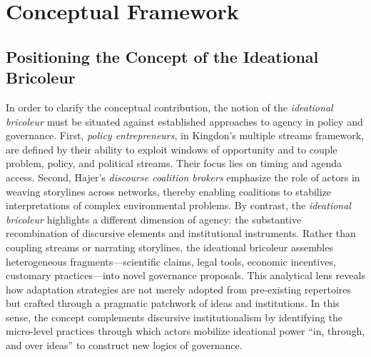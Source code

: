 \section*{Conceptual Framework}
\subsection*{Positioning the Concept of the Ideational Bricoleur}

In order to clarify the conceptual contribution, the notion of the 
\textit{ideational bricoleur} must be situated against established approaches to 
agency in policy and governance. First, \textit{policy entrepreneurs}, in 
Kingdon’s multiple streams framework, are defined by their ability to exploit 
windows of opportunity and to couple problem, policy, and political streams. 
Their focus lies on timing and agenda access. Second, Hajer’s 
\textit{discourse coalition brokers} emphasize the role of actors in weaving 
storylines across networks, thereby enabling coalitions to stabilize 
interpretations of complex environmental problems. By contrast, the 
\textit{ideational bricoleur} highlights a different dimension of agency: the 
substantive recombination of discursive elements and institutional instruments. 
Rather than coupling streams or narrating storylines, the ideational bricoleur 
assembles heterogeneous fragments---scientific claims, legal tools, economic 
incentives, customary practices---into novel governance proposals. This 
analytical lens reveals how adaptation strategies are not merely adopted from 
pre-existing repertoires but crafted through a pragmatic patchwork of ideas and 
institutions. In this sense, the concept complements discursive institutionalism 
by identifying the micro-level practices through which actors mobilize ideational 
power ``in, through, and over ideas'' to construct new logics of governance.



